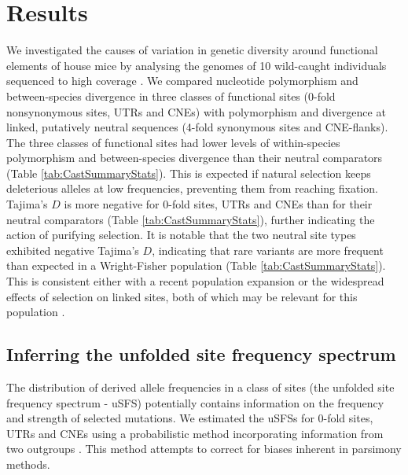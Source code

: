 \section{Results}

	We investigated the causes of variation in genetic diversity around functional elements of house mice by analysing the genomes of 10 wild-caught individuals sequenced to high coverage \citep{RN122}. We compared nucleotide polymorphism and between-species divergence in three classes of functional sites (0-fold nonsynonymous sites, UTRs and CNEs) with polymorphism and divergence at linked, putatively neutral sequences (4-fold synonymous sites and CNE-flanks). The three classes of functional sites had lower levels of within-species polymorphism and between-species divergence than their neutral comparators (Table \ref{tab:CastSummaryStats}). This is expected if natural selection keeps deleterious alleles at low frequencies, preventing them from reaching fixation. Tajima’s $D$ is more negative for 0-fold sites, UTRs and CNEs than for their neutral comparators (Table \ref{tab:CastSummaryStats}), further indicating the action of purifying selection. It is notable that the two neutral site types exhibited negative Tajima’s $D$, indicating that rare variants are more frequent than expected in a Wright-Fisher population (Table \ref{tab:CastSummaryStats}). This is consistent either with a recent population expansion or the widespread effects of selection on linked sites, both of which may be relevant for this population \citep{RN122,RN340}. 
	
\linespread{1}

\linespread{2}



\subsection{Inferring the unfolded site frequency spectrum}

	The distribution of derived allele frequencies in a class of sites (the unfolded site frequency spectrum - uSFS) potentially contains information on the frequency and strength of selected mutations. We estimated the uSFSs for 0-fold sites, UTRs and CNEs using a probabilistic method incorporating information from two outgroups \citep{RN321}. This method attempts to correct for biases inherent in parsimony methods. 

